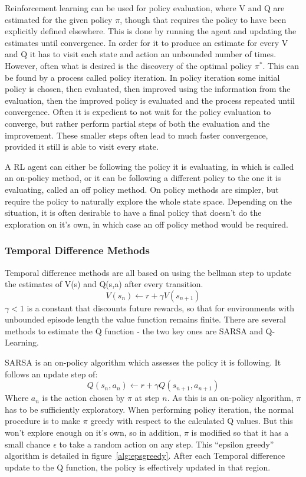 Reinforcement learning can be used for policy evaluation, where V and Q are estimated for the given policy $\pi$, though that requires the policy to have been explicitly defined elsewhere. This is done by running the agent and updating the estimates until convergence. In order for it to produce an estimate for every V and Q it has to visit each state and action an unbounded number of times. However, often what is desired is the discovery of the optimal policy $\pi^*$. This can be found by a process called policy iteration. In policy iteration some initial policy is chosen, then evaluated, then improved using the information from the evaluation, then the improved policy is evaluated and the process repeated until convergence. Often it is expedient to not wait for the policy evaluation to converge, but rather perform partial steps of both the evaluation and the improvement. These smaller steps often lead to much faster convergence, provided it still is able to visit every state.

A RL agent can either  be following the policy it is evaluating, in which is called an on-policy method, or it can be following a different policy to the one it is evaluating, called an off policy method. On policy methods are simpler, but require the policy to naturally explore the whole state space. Depending on the situation, it is often desirable to have a final policy that doesn't do the exploration on it's own, in which case an off policy method would be required.

\subsubsection{Temporal Difference Methods}
Temporal difference methods are all based on using the bellman step to update the estimates of V(s) and Q(s,a) after every transition.
\begin{equation}
V(s_n) \gets r + \gamma V(s_{n+1})
\end{equation}
$\gamma < 1$ is a constant that discounts future rewards, so that for environments with unbounded episode length the value function remains finite. There are several methods to estimate the Q function - the two key ones are SARSA and Q-Learning.

SARSA is an on-policy algorithm which assesses the policy it is following. It follows an update step of:
\begin{equation}
Q(s_n,a_n) \gets r + \gamma Q(s_{n+1}, a_{n+1}) 
\end{equation}
Where $a_n$ is the action chosen by $\pi$ at step $n$. As this is an on-policy algorithm, $\pi$ has to be sufficiently exploratory. When performing policy iteration, the normal procedure is to make $\pi$ greedy with respect to the calculated Q values. But this won't explore enough on it's own, so in addition, $\pi$ is modified so that it has a small chance $\epsilon$ to take a random action on any step. This ``epsilon greedy'' algorithm is detailed in figure~\ref{alg:epsgreedy}. After each Temporal difference update to the Q function, the policy is effectively updated in that region.

